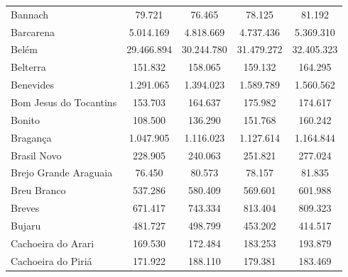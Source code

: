 \begin{table}[H]
{\begin{tabular}{l|c|c|c|c}
   Bannach                &  79.721     &  76.465     &  78.125     &  81.192       \\
   Barcarena              & 5.014.169   &  4.818.669  &  4.737.436  &  5.369.310    \\
   Belém                  & 29.466.894  &  30.244.780 &  31.479.272 &  32.405.323   \\
   Belterra               & 151.832     &  158.065    &  159.132    &  164.295      \\
   Benevides              & 1.291.065   & 1.394.023   &  1.589.789  &  1.560.562    \\
   Bom Jesus do Tocantins & 153.703     &  164.637    &  175.982    &  174.617      \\
   Bonito                 & 108.500     &  136.290    &  151.768    &  160.242      \\
   Bragança               & 1.047.905   &  1.116.023  &  1.127.614  &  1.164.844    \\
   Brasil Novo            &  228.905    &  240.063    &  251.821    &  277.024      \\
   Brejo Grande Araguaia  &  76.450     &  80.573     & 78.157      &  81.835       \\
   Breu Branco            & 537.286     &  580.409    & 569.601     &  601.988      \\
   Breves                 & 671.417     &  743.334    &  813.404    &  809.323      \\
   Bujaru                 & 481.727     &  498.799    &  453.202    &  414.517      \\
   Cachoeira do Arari     & 169.530     &  172.484    &  183.253    &  193.879      \\
   Cachoeira do Piriá     & 171.922     &  188.110    &  179.381    &  183.469      \\
   \hline
\end{tabular}}
\end{table}

